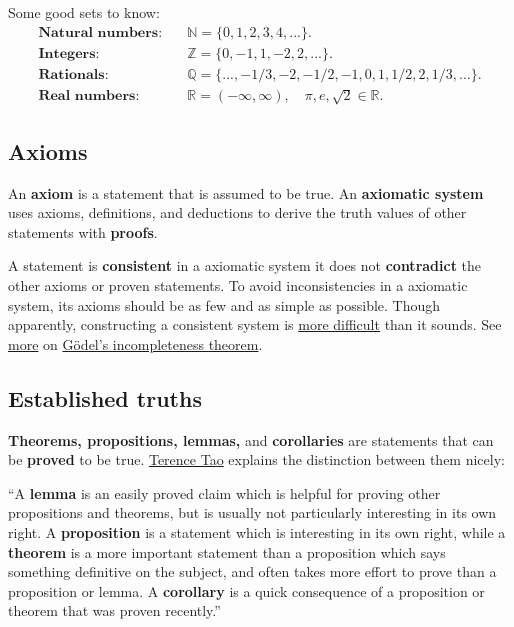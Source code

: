\documentclass{article}[12pt]
\newcommand{\N}{\mathbb{N}}
\newcommand{\Z}{\mathbb{Z}}
\newcommand{\Q}{\mathbb{Q}}
\newcommand{\R}{\mathbb{R}}
\begin{document}
            Some good sets to know:
            \begin{align*}
                \textbf{Natural numbers:}\quad &
                    \N = \{0, 1, 2, 3, 4, ...\}.
                \\
                \textbf{Integers:}\quad &
                    \Z = \{0, -1, 1, -2, 2, ...\}.
                \\
                \textbf{Rationals:}\quad &
                    \Q = \{..., -1/3, -2, -1/2, -1, 0, 1, 1/2, 2, 1/3, ...\}.
                \\
                \textbf{Real numbers:}\quad &
                    \R = (-\infty, \infty), \quad
                    \pi, e, \sqrt{2} \in \R.
            \end{align*}
            
        \subsection{Axioms}
        
            An \textbf{axiom} is a statement that is assumed to be true. An \textbf{axiomatic system} uses axioms, definitions, and deductions to derive the truth values of other statements with \textbf{proofs}.
            
            A statement is \textbf{consistent} in a axiomatic system it does not \textbf{contradict} the other axioms or proven statements. To avoid inconsistencies in a axiomatic system, its axioms should be as few and as simple as possible. Though apparently, constructing a consistent system is \href{https://youtu.be/2YIKpHxitNk?t=192}{more difficult} than it sounds.\cite{rayo-mit} See \href{https://www.youtube.com/watch?v=I4pQbo5MQOs}{more} on \href{https://www.youtube.com/watch?v=O4ndIDcDSGc}{Gödel's incompleteness theorem}.
    
        \subsection{Established truths}
        
            \textbf{Theorems, propositions, lemmas,} and \textbf{corollaries} are statements that can be \textbf{proved} to be true. \href{https://youtu.be/MXJ-zpJeY3E}{Terence Tao} explains the distinction between them nicely:
            \begin{displayquote}
                ``A \textbf{lemma} is an easily proved claim which is helpful for proving other propositions and theorems, but is usually not particularly interesting in its own right. A \textbf{proposition} is a statement which is interesting in its own right, while a \textbf{theorem} is a more important statement than a proposition which says something definitive on the subject, and often takes more effort to prove than a proposition or lemma. A \textbf{corollary} is a quick consequence of a proposition or theorem that was proven recently.''\cite{tao-book}
            \end{displayquote}
            
\end{document}

